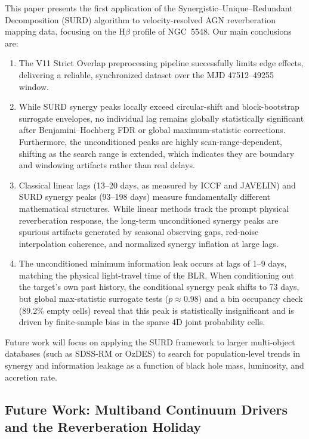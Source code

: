 \documentclass[fleqn,usenatbib]{mnras}
\begin{document}
This paper presents the first application of the Synergistic–Unique–Redundant Decomposition (SURD) algorithm to velocity-resolved AGN reverberation mapping data, focusing on the H\(\beta\) profile of NGC~5548. Our main conclusions are:
\begin{enumerate}
\item The V11 Strict Overlap preprocessing pipeline successfully limits edge effects, delivering a reliable, synchronized dataset over the MJD 47512--49255 window.
\item While SURD synergy peaks locally exceed circular-shift and block-bootstrap surrogate envelopes, no individual lag remains globally statistically significant after Benjamini–Hochberg FDR or global maximum-statistic corrections. Furthermore, the unconditioned peaks are highly scan-range-dependent, shifting as the search range is extended, which indicates they are boundary and windowing artifacts rather than real delays.
\item Classical linear lags (13--20 days, as measured by ICCF and JAVELIN) and SURD synergy peaks (93--198 days) measure fundamentally different mathematical structures. While linear methods track the prompt physical reverberation response, the long-term unconditioned synergy peaks are spurious artifacts generated by seasonal observing gaps, red-noise interpolation coherence, and normalized synergy inflation at large lags.
\item The unconditioned minimum information leak occurs at lags of 1--9 days, matching the physical light-travel time of the BLR. When conditioning out the target's own past history, the conditional synergy peak shifts to 73 days, but global max-statistic surrogate tests ($p \approx 0.98$) and a bin occupancy check (89.2\% empty cells) reveal that this peak is statistically insignificant and is driven by finite-sample bias in the sparse 4D joint probability cells.
\end{enumerate}

Future work will focus on applying the SURD framework to larger multi-object databases (such as SDSS-RM or OzDES) to search for population-level trends in synergy and information leakage as a function of black hole mass, luminosity, and accretion rate.

\subsection{Future Work: Multiband Continuum Drivers and the Reverberation Holiday}
\label{sec:future_multiband}
\end{document}

